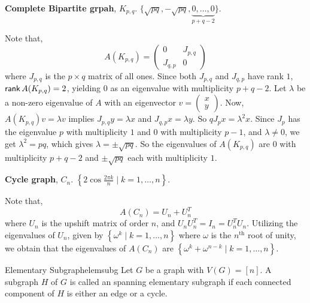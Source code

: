 \documentclass[../basic_graph_theory.tex]{subfiles}
\begin{document}
\begin{tcolorbox}[breakable]
  \textbf{Complete Bipartite grpah}, \(K_{p, q}\). \(\big\{ \sqrt{pq}, -\sqrt{pq}, \underbrace{0, \dots, 0}_{p + q - 2} \big\}\).

  \ssk

  Note that,
  \[A(K_{p, q}) = \begin{pmatrix}
      0        & J_{p, q} \\
      J_{q, p} & 0
    \end{pmatrix}\]
  where \(J_{p, q}\) is the \(p \times q\) matrix of all ones. Since both \(J_{p, q}\) and \(J_{q, p}\) have rank \(1\), \(\operatorname{\mathsf{rank}} A(K_{p, q}) = 2\), yielding \(0\) as an eigenvalue with multiplicity \(p + q - 2\).
  Let \(\lambda\) be a non-zero eigenvalue of \(A\) with an eigenvector \(v = \begin{pmatrix} x \\ y \end{pmatrix}\). Now, \(A(K_{p, q})v = \lambda v\) implies \(J_{p, q}y = \lambda x\) and \(J_{q, p}x = \lambda y\). So \(qJ_px = \lambda^2 x\). Since \(J_p\) has the eigenvalue \(p\) with multiplicity \(1\) and \(0\) with multiplicity \(p - 1\), and \(\lambda \neq 0\), we get \(\lambda^2 = pq\), which gives \(\lambda = \pm \sqrt{pq}\). So the eigenvalues of \(A(K_{p, q})\) are \(0\) with multiplicity \(p + q - 2\) and \(\pm \sqrt{pq}\) each with multiplicity \(1\).
\end{tcolorbox}

\begin{tcolorbox}[breakable]
  \textbf{Cycle graph}, \(C_n\). \(\left\{ 2\cos{\frac{2\pi k}{n}} \mid k = 1, \dots, n \right\}\).

  \ssk

  Note that,
  \[ A(C_n) = U_n + U_n^{T} \]
  where \(U_n\) is the upshift matrix of order \(n\), and \(U_n U_n^T = I_n = U_n^T U_n\). Utilizing the eigenvalues of \(U_n\), given by \(\left\{ \omega^k \mid k = 1, \dots, n \right\}\) where \(\omega\) is the \(n^{\text{th}}\) root of unity, we obtain that the eigenvalues of \(A(C_n)\) are \(\left\{ \omega^k + \omega^{n-k} \mid k = 1, \dots, n \right\}\).
\end{tcolorbox}

\begin{Def}{Elementary Subgraph}{elemsubg}
  Let \(G\) be a graph with \(V(G) = [n]\). A subgraph \(H\) of \(G\) is called an spanning elementary subgraph if each connected component of \(H\) is either an edge or a cycle.
\end{Def}
\end{document}
